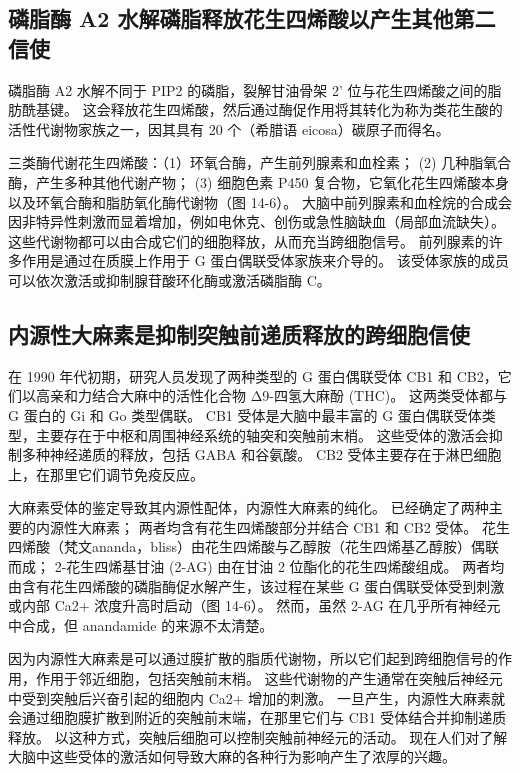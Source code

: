 \subsection{磷脂酶 A2 水解磷脂释放花生四烯酸以产生其他第二信使}
磷脂酶 A2 水解不同于 PIP2 的磷脂，裂解甘油骨架 2' 位与花生四烯酸之间的脂肪酰基键。 这会释放花生四烯酸，然后通过酶促作用将其转化为称为类花生酸的活性代谢物家族之一，因其具有 20 个（希腊语 eicosa）碳原子而得名。

三类酶代谢花生四烯酸：（1）环氧合酶，产生前列腺素和血栓素； (2) 几种脂氧合酶，产生多种其他代谢产物； (3) 细胞色素 P450 复合物，它氧化花生四烯酸本身以及环氧合酶和脂肪氧化酶代谢物（图 14-6）。 大脑中前列腺素和血栓烷的合成会因非特异性刺激而显着增加，例如电休克、创伤或急性脑缺血（局部血流缺失）。 这些代谢物都可以由合成它们的细胞释放，从而充当跨细胞信号。 前列腺素的许多作用是通过在质膜上作用于 G 蛋白偶联受体家族来介导的。 该受体家族的成员可以依次激活或抑制腺苷酸环化酶或激活磷脂酶 C。

\subsection{内源性大麻素是抑制突触前递质释放的跨细胞信使}
在 1990 年代初期，研究人员发现了两种类型的 G 蛋白偶联受体 CB1 和 CB2，它们以高亲和力结合大麻中的活性化合物 Δ9-四氢大麻酚 (THC)。 这两类受体都与 G 蛋白的 Gi 和 Go 类型偶联。 CB1 受体是大脑中最丰富的 G 蛋白偶联受体类型，主要存在于中枢和周围神经系统的轴突和突触前末梢。 这些受体的激活会抑制多种神经递质的释放，包括 GABA 和谷氨酸。 CB2 受体主要存在于淋巴细胞上，在那里它们调节免疫反应。

大麻素受体的鉴定导致其内源性配体，内源性大麻素的纯化。 已经确定了两种主要的内源性大麻素； 两者均含有花生四烯酸部分并结合 CB1 和 CB2 受体。 花生四烯酸（梵文ananda，bliss）由花生四烯酸与乙醇胺（花生四烯基乙醇胺）偶联而成； 2-花生四烯基甘油 (2-AG) 由在甘油 2 位酯化的花生四烯酸组成。 两者均由含有花生四烯酸的磷脂酶促水解产生，该过程在某些 G 蛋白偶联受体受到刺激或内部 Ca2+ 浓度升高时启动（图 14-6）。 然而，虽然 2-AG 在几乎所有神经元中合成，但 anandamide 的来源不太清楚。

因为内源性大麻素是可以通过膜扩散的脂质代谢物，所以它们起到跨细胞信号的作用，作用于邻近细胞，包括突触前末梢。 这些代谢物的产生通常在突触后神经元中受到突触后兴奋引起的细胞内 Ca2+ 增加的刺激。 一旦产生，内源性大麻素就会通过细胞膜扩散到附近的突触前末端，在那里它们与 CB1 受体结合并抑制递质释放。 以这种方式，突触后细胞可以控制突触前神经元的活动。 现在人们对了解大脑中这些受体的激活如何导致大麻的各种行为影响产生了浓厚的兴趣。



